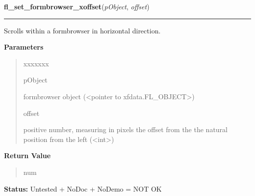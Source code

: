 \hspace{.8\funcindent}\begin{boxedminipage}{\funcwidth}

    \raggedright \textbf{fl\_set\_formbrowser\_xoffset}(\textit{pObject}, \textit{offset})

    \vspace{-1.5ex}

    \rule{\textwidth}{0.5\fboxrule}
\setlength{\parskip}{2ex}
    Scrolls within a formbrowser in horizontal direction.

\setlength{\parskip}{1ex}
      \textbf{Parameters}
      \vspace{-1ex}

      \begin{quote}
        \begin{Ventry}{xxxxxxx}

          \item[pObject]

          formbrowser object ({\textless}pointer to 
          xfdata.FL\_OBJECT{\textgreater})

          \item[offset]

          positive number, measuring in pixels the offset from the the 
          natural position from the left ({\textless}int{\textgreater})

        \end{Ventry}

      \end{quote}

      \textbf{Return Value}
    \vspace{-1ex}

      \begin{quote}
      num

      \end{quote}

\textbf{Status:} Untested + NoDoc + NoDemo = NOT OK



    \end{boxedminipage}

    \label{xformslib:library:fl_set_formbrowser_yoffset}

    \vspace{0.5ex}

